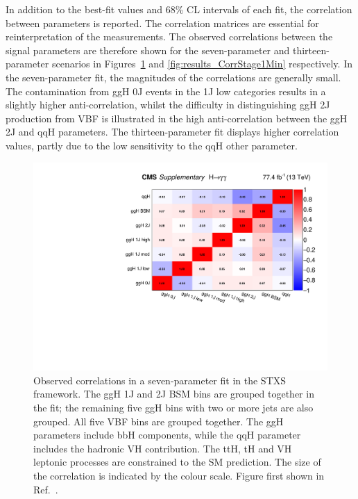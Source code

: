 In addition to the best-fit values and 68\% CL intervals of each fit, 
the correlation between parameters is reported.
The correlation matrices are essential for reinterpretation of the measurements.
The observed correlations between the signal parameters are therefore shown for the
seven-parameter and thirteen-parameter scenarios 
in Figures~\ref{fig:results_CorrStage1} and \ref{fig:results_CorrStage1Min} respectively.
In the seven-parameter fit, the magnitudes of the correlations are generally small.
The contamination from ggH 0J events in the 1J low categories results in a slightly higher 
anti-correlation, whilst the difficulty in distinguishing ggH 2J production from VBF 
is illustrated in the high anti-correlation between the ggH 2J and qqH parameters.
The thirteen-parameter fit displays higher correlation values, 
partly due to the low sensitivity to the qqH other parameter.

\begin{figure}[hptb]
  \centering
  \includegraphics[width=\textwidth]{Figures/Results/CorrStage1.pdf}
  \caption[Observed correlations in a seven-parameter fit in the STXS framework.]
  {
    Observed correlations in a seven-parameter fit in the STXS framework. 
    The ggH 1J and 2J BSM bins are grouped together in the fit; 
    the remaining five ggH bins with two or more jets are also grouped. 
    All five VBF bins are grouped together. 
    The ggH parameters include bbH components, 
    while the qqH parameter includes the hadronic VH contribution. 
    The ttH, tH and VH leptonic processes are constrained to the SM prediction. 
    The size of the correlation is indicated by the colour scale.
    Figure first shown in Ref.~\cite{HIG-18-029}.
  }
  \label{fig:results_CorrStage1}
\end{figure}

